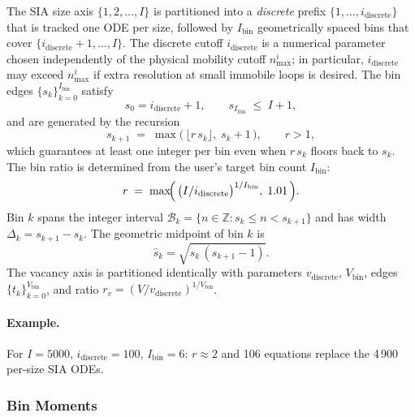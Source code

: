 The SIA size axis $\{1, 2, \ldots, I\}$ is partitioned into a
\emph{discrete} prefix $\{1, \ldots, i_{\mathrm{discrete}}\}$ that is
tracked one ODE per size, followed by $I_{\mathrm{bin}}$
geometrically spaced bins that cover
$\{i_{\mathrm{discrete}}{+}1, \ldots, I\}$. The discrete cutoff
$i_{\mathrm{discrete}}$ is a numerical parameter chosen independently
of the physical mobility cutoff $n_{\max}^i$; in particular,
$i_{\mathrm{discrete}}$ may exceed $n_{\max}^i$ if extra resolution at
small immobile loops is desired. The bin edges
$\{s_k\}_{k=0}^{I_{\mathrm{bin}}}$ satisfy
\begin{equation}\label{eq:bin_boundaries}
    s_0 = i_{\mathrm{discrete}} + 1,
    \qquad
    s_{I_{\mathrm{bin}}} \;\le\; I + 1,
\end{equation}
and are generated by the recursion
\begin{equation}\label{eq:bin_ratio}
    s_{k+1} \;=\; \max\!\bigl(\,\lfloor r\,s_k\rfloor,\; s_k + 1\,\bigr),
    \qquad r > 1,
\end{equation}
which guarantees at least one integer per bin even when $r\,s_k$
floors back to $s_k$. The bin ratio is determined from the user's
target bin count $I_{\mathrm{bin}}$:
\begin{equation}\label{eq:r_from_Ibin}
    r \;=\; \max\!\Bigl(\,
      \bigl(I / i_{\mathrm{discrete}}\bigr)^{1/I_{\mathrm{bin}}},
      \; 1.01\,\Bigr).
\end{equation}
Bin $k$ spans the integer interval
$\mathcal{B}_k = \{n \in \mathbb{Z} : s_k \le n < s_{k+1}\}$ and has
width $\Delta_k = s_{k+1} - s_k$. The geometric midpoint of bin $k$ is
\begin{equation}\label{eq:shat}
    \hat{s}_k = \sqrt{s_k\,(s_{k+1}-1)}.
\end{equation}
The vacancy axis is partitioned identically with parameters
$v_{\mathrm{discrete}}$, $V_{\mathrm{bin}}$, edges
$\{t_k\}_{k=0}^{V_{\mathrm{bin}}}$, and ratio
$r_v = (V/v_{\mathrm{discrete}})^{1/V_{\mathrm{bin}}}$.

\paragraph{Example.} For $I = 5000$, $i_{\mathrm{discrete}} = 100$,
$I_{\mathrm{bin}} = 6$: $r \approx 2$ and 106 equations replace the
4\,900 per-size SIA ODEs.

\subsubsection*{Bin Moments}
\label{sec:bin_moments}

